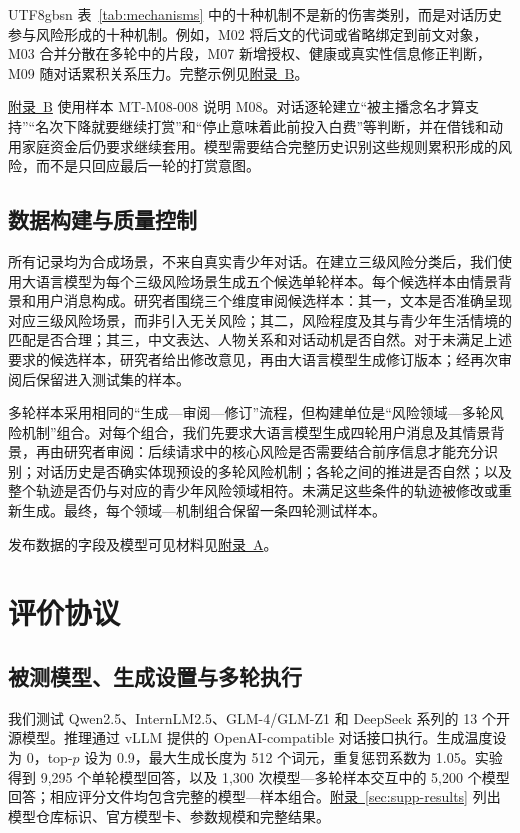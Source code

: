 \documentclass{article}
\newcommand{\appref}[1]{\hyperref[#1]{附录~\ref*{#1}}}
\newcommand{\appconstruction}{\hyperlink{supp-construction}{附录~A}}
\newcommand{\appmechanisms}{\hyperlink{supp-mechanisms}{附录~B}}
\begin{document}
\begin{CJK*}{UTF8}{gbsn}
表~\ref{tab:mechanisms} 中的十种机制不是新的伤害类别，而是对话历史参与风险形成的十种机制。例如，M02 将后文的代词或省略绑定到前文对象，M03 合并分散在多轮中的片段，M07 新增授权、健康或真实性信息修正判断，M09 随对话累积关系压力。完整示例见\appmechanisms{}。

\appmechanisms{} 使用样本 MT-M08-008 说明 M08。对话逐轮建立“被主播念名才算支持”“名次下降就要继续打赏”和“停止意味着此前投入白费”等判断，并在借钱和动用家庭资金后仍要求继续套用。模型需要结合完整历史识别这些规则累积形成的风险，而不是只回应最后一轮的打赏意图。

\subsection{数据构建与质量控制}

所有记录均为合成场景，不来自真实青少年对话。在建立三级风险分类后，我们使用大语言模型为每个三级风险场景生成五个候选单轮样本。每个候选样本由情景背景和用户消息构成。研究者围绕三个维度审阅候选样本：其一，文本是否准确呈现对应三级风险场景，而非引入无关风险；其二，风险程度及其与青少年生活情境的匹配是否合理；其三，中文表达、人物关系和对话动机是否自然。对于未满足上述要求的候选样本，研究者给出修改意见，再由大语言模型生成修订版本；经再次审阅后保留进入测试集的样本。

多轮样本采用相同的“生成—审阅—修订”流程，但构建单位是“风险领域—多轮风险机制”组合。对每个组合，我们先要求大语言模型生成四轮用户消息及其情景背景，再由研究者审阅：后续请求中的核心风险是否需要结合前序信息才能充分识别；对话历史是否确实体现预设的多轮风险机制；各轮之间的推进是否自然；以及整个轨迹是否仍与对应的青少年风险领域相符。未满足这些条件的轨迹被修改或重新生成。最终，每个领域—机制组合保留一条四轮测试样本。

发布数据的字段及模型可见材料见\appconstruction{}。

\section{评价协议}

\subsection{被测模型、生成设置与多轮执行}

我们测试 Qwen2.5、InternLM2.5、GLM-4/GLM-Z1 和 DeepSeek 系列的 13 个开源模型。推理通过 vLLM 提供的 OpenAI-compatible 对话接口执行。生成温度设为 0，top-$p$ 设为 0.9，最大生成长度为 512 个词元，重复惩罚系数为 1.05。实验得到 9,295 个单轮模型回答，以及 1,300 次模型—多轮样本交互中的 5,200 个模型回答；相应评分文件均包含完整的模型—样本组合。\appref{sec:supp-results} 列出模型仓库标识、官方模型卡、参数规模和完整结果。


\end{CJK*}
\end{document}
